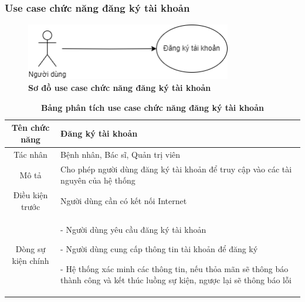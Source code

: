 \subsubsection{Use case chức năng đăng ký tài khoản}
  \begin{figure}[H]
    \centering
    \includegraphics[width=9cm,height=2.5cm]{Images/use_case/use_case_register.png}
    \caption[Sơ đồ use case chức năng đăng ký tài khoản]{\bfseries \fontsize{12pt}{0pt}
    \selectfont Sơ đồ use case chức năng đăng ký tài khoản}
    \label{use_case_register} %
  \end{figure}

  \begin{table}[H]
    \caption{\bfseries \fontsize{12pt}{0pt}\selectfont Bảng phân tích use case chức năng đăng ký tài khoản}
    \centering
    \begin{tabularx}{0.9\textwidth}{|c|X|}
      \hline
      \textbf{Tên chức năng} & \textbf{Đăng ký tài khoản} \\
      \hline
      Tác nhân & Bệnh nhân, Bác sĩ, Quản trị viên \\
      \hline
      Mô tả & Cho phép người dùng đăng ký tài khoản để truy cập vào các tài nguyên của hệ thống 
       \\
      \hline
      Điều kiện trước & Người dùng cần có kết nối Internet \\
      \hline
      Dòng sự kiện chính & 
        - Người dùng yêu cầu đăng ký tài khoản

        - Người dùng cung cấp thông tin tài khoản để đăng ký

        - Hệ thống xác minh các thông tin, nếu thỏa mãn sẽ thông báo thành công và kết thúc luồng sự kiện, ngược lại 
        sẽ thông báo lỗi 
        \\
      \hline
    \end{tabularx}
  \end{table}

